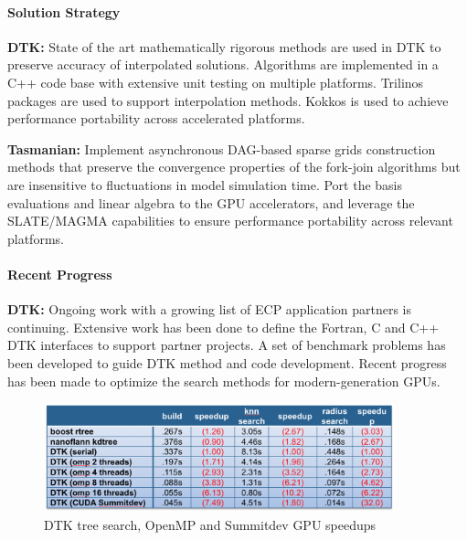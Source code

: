 \paragraph{Solution Strategy}

\nobreak


\indent

{\bf DTK:}
State of the art mathematically rigorous methods are used in
DTK to preserve accuracy of interpolated solutions.
Algorithms are implemented in a C++ code base with extensive
unit testing on multiple platforms.
Trilinos packages are used to support interpolation methods.
Kokkos is used to achieve performance portability
across accelerated platforms.

{\bf Tasmanian:}
Implement asynchronous DAG-based sparse grids construction methods
that preserve the convergence properties of the fork-join algorithms
but are insensitive to fluctuations in model simulation time.
Port the basis evaluations and linear algebra to the
GPU accelerators, and leverage the SLATE/MAGMA capabilities
to ensure performance portability across relevant platforms.



\paragraph{Recent Progress}

\indent

{\bf DTK:}
Ongoing work with a growing list of ECP application partners
is continuing.
Extensive work has been done to define the Fortran, C and
C++ DTK interfaces to support partner projects.
A set of benchmark problems has been developed
to guide DTK method and code development.
Recent progress has been made to optimize the search methods
for modern-generation GPUs.

\begin{figure}[htb]
        \centering
        \includegraphics[width=4in]{projects/2.3.3-MathLibs/2.3.3.11-ALExa/dtk-gpu}
        \caption{\label{fig:dtk-gpu}DTK tree search, OpenMP and Summitdev GPU speedups}
\end{figure}

